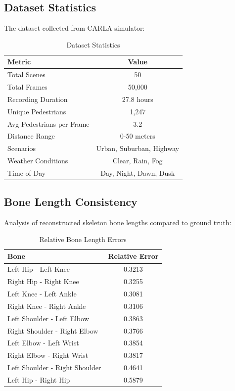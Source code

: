 \documentclass[11pt,a4paper]{article}
\begin{document}
\subsection{Dataset Statistics}

The dataset collected from CARLA simulator:

\begin{table}[h]
\centering
\caption{Dataset Statistics}
\begin{tabular}{lc}
\toprule
\textbf{Metric} & \textbf{Value} \\
\midrule
Total Scenes & 50 \\
Total Frames & 50,000 \\
Recording Duration & 27.8 hours \\
Unique Pedestrians & 1,247 \\
Avg Pedestrians per Frame & 3.2 \\
Distance Range & 0-50 meters \\
Scenarios & Urban, Suburban, Highway \\
Weather Conditions & Clear, Rain, Fog \\
Time of Day & Day, Night, Dawn, Dusk \\
\bottomrule
\end{tabular}
\end{table}

\subsection{Bone Length Consistency}

Analysis of reconstructed skeleton bone lengths compared to ground truth:

\begin{table}[h]
\centering
\caption{Relative Bone Length Errors}
\begin{tabular}{lc}
\toprule
\textbf{Bone} & \textbf{Relative Error} \\
\midrule
Left Hip - Left Knee & 0.3213 \\
Right Hip - Right Knee & 0.3255 \\
Left Knee - Left Ankle & 0.3081 \\
Right Knee - Right Ankle & 0.3106 \\
Left Shoulder - Left Elbow & 0.3863 \\
Right Shoulder - Right Elbow & 0.3766 \\
Left Elbow - Left Wrist & 0.3854 \\
Right Elbow - Right Wrist & 0.3817 \\
Left Shoulder - Right Shoulder & 0.4641 \\
Left Hip - Right Hip & 0.5879 \\
\bottomrule
\end{tabular}
\end{table}
\end{document}
